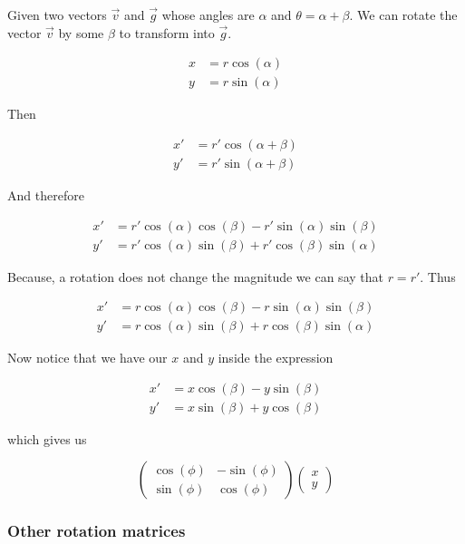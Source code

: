 Given two vectors \(\vec{v}\) and \(\vec{g}\) whose angles are \(\alpha\) and \(\theta = \alpha + \beta\). 
We can rotate the vector \(\vec{v}\) by some \(\beta\) to transform into \(\vec{g}\).

\begin{align*}
    x &= r \cos(\alpha)\\
    y &= r \sin(\alpha)
\end{align*}

Then 

\begin{align*}
    x' &= r' \cos(\alpha + \beta)\\
    y' &= r' \sin(\alpha + \beta)
\end{align*}

And therefore

\begin{align*}
    x' &= r' \cos(\alpha)\cos(\beta) - r'\sin(\alpha)\sin(\beta)\\
    y' &= r' \cos(\alpha)\sin(\beta) + r'\cos(\beta)\sin(\alpha)
\end{align*}

Because, a rotation does not change the magnitude we can say that \(r = r'\). Thus 

\begin{align*}
    x' &= r \cos(\alpha)\cos(\beta) - r\sin(\alpha)\sin(\beta)\\
    y' &= r \cos(\alpha)\sin(\beta) + r\cos(\beta)\sin(\alpha)
\end{align*}

Now notice that we have our \(x\) and \(y\) inside the expression

\begin{align*}
    x' &= x\cos(\beta) - y\sin(\beta)\\
    y' &= x\sin(\beta) + y\cos(\beta)
\end{align*}

which gives us 

\[
    \begin{pmatrix}
        \cos(\phi) & -\sin(\phi)\\
        \sin(\phi) & \cos(\phi)
    \end{pmatrix}
    \begin{pmatrix}
        x\\
        y
    \end{pmatrix}
\]

\QED

\subsubsection{Other rotation matrices}

